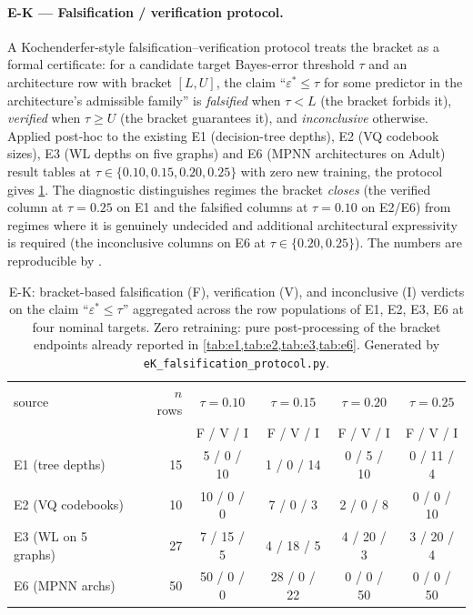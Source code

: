 \documentclass[10pt]{article}
\theoremstyle{definition}
\theoremstyle{remark}
\newcommand{\eps}{\varepsilon}
\begin{document}
\paragraph{E-K --- Falsification / verification protocol.}
A Kochenderfer-style falsification--verification protocol
\citep{kochenderfer2022algorithms} treats the bracket as a
formal certificate: for a candidate target Bayes-error
threshold $\tau$ and an architecture row with bracket
$[L, U]$, the claim ``$\eps^{*} \le \tau$ for some predictor in
the architecture's admissible family'' is
\emph{falsified} when $\tau < L$ (the bracket forbids it),
\emph{verified} when $\tau \ge U$ (the bracket guarantees it),
and \emph{inconclusive} otherwise. Applied post-hoc to the
existing E1 (decision-tree depths), E2 (VQ codebook sizes),
E3 (WL depths on five graphs) and E6 (MPNN architectures on
Adult) result tables at $\tau \in \{0.10, 0.15, 0.20, 0.25\}$
with zero new training, the protocol gives
\cref{tab:eK}. The diagnostic distinguishes regimes the bracket
\emph{closes} (the verified column at $\tau = 0.25$ on E1 and
the falsified columns at $\tau = 0.10$ on E2/E6) from regimes
where it is genuinely undecided and additional architectural
expressivity is required (the inconclusive columns on E6 at
$\tau \in \{0.20, 0.25\}$). The numbers are reproducible by
.

\begin{table}[h]\centering\small
\begin{tabular}{lrcccc}
\toprule
source & $n$ rows & $\tau = 0.10$ & $\tau = 0.15$
       & $\tau = 0.20$ & $\tau = 0.25$ \\
       &         & F / V / I    & F / V / I
       & F / V / I    & F / V / I \\
\midrule
E1 (tree depths)        & 15 & 5 / 0 / 10  & 1 / 0 / 14 & 0 / 5 / 10  & 0 / 11 / 4 \\
E2 (VQ codebooks)       & 10 & 10 / 0 / 0  & 7 / 0 / 3  & 2 / 0 / 8   & 0 / 0 / 10 \\
E3 (WL on 5 graphs)     & 27 & 7 / 15 / 5  & 4 / 18 / 5 & 4 / 20 / 3  & 3 / 20 / 4 \\
E6 (MPNN archs)         & 50 & 50 / 0 / 0  & 28 / 0 / 22 & 0 / 0 / 50 & 0 / 0 / 50 \\
\bottomrule
\end{tabular}
\caption{E-K: bracket-based falsification (F), verification (V),
and inconclusive (I) verdicts on the claim
``$\eps^{*} \le \tau$'' aggregated across the row populations of
E1, E2, E3, E6 at four nominal targets. Zero retraining: pure
post-processing of the bracket endpoints already reported in
\cref{tab:e1,tab:e2,tab:e3,tab:e6}. Generated by
\texttt{eK\_falsification\_protocol.py}.}
\label{tab:eK}
\end{table}
\end{document}
